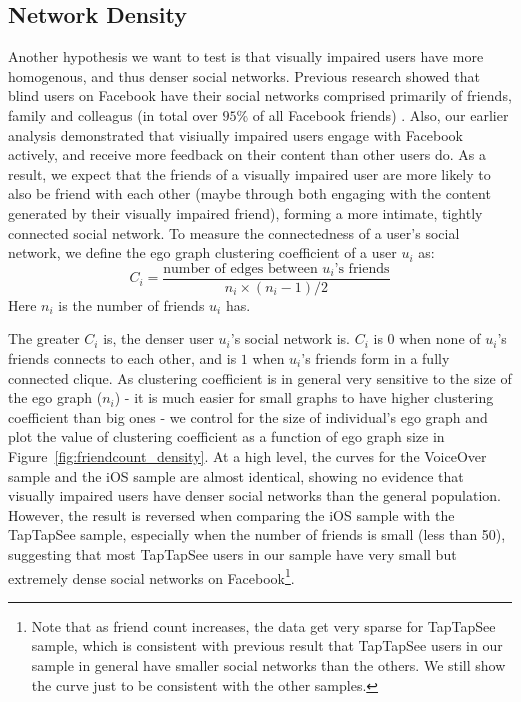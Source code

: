 \documentclass{sigchi}
\begin{document}
\subsection{Network Density}

Another hypothesis we want to test is that visually impaired users have more homogenous, and thus denser social networks. Previous research showed that blind users on Facebook have their social networks comprised primarily of friends, family and colleagus (in total over $95\%$ of all Facebook friends) \cite{brady2013cscw}. Also, our earlier analysis demonstrated that visiually impaired users engage with Facebook actively, and receive more feedback on their content than other users do. As a result, we expect that the friends of a visually impaired user are more likely to also be friend with each other (maybe through both engaging with the content generated by their visually impaired friend), forming a more intimate, tightly connected social network. To measure the connectedness of a user's social network, we define the ego graph clustering coefficient of a user $u_i$ as:
\begin{equation}
C_i=\frac{\text{number of edges between } u_i\text{'s friends}}{n_i\times(n_i-1)/2}
\end{equation}
Here $n_i$ is the number of friends $u_i$ has.

The greater $C_i$ is, the denser user $u_i$'s social network is. $C_i$ is $0$ when none of $u_i$'s friends connects to each other, and is $1$ when $u_i$'s friends form in a fully connected clique. As clustering coefficient is in general very sensitive to the size of the ego graph ($n_i$) - it is much easier for small graphs to have higher clustering coefficient than big ones - we control for the size of individual's ego graph and plot the value of clustering coefficient as a function of ego graph size in Figure~\ref{fig:friendcount_density}. At a high level, the curves for the VoiceOver sample and the iOS sample are almost identical, showing no evidence that visually impaired users have denser social networks than the general population.
However, the result is reversed when comparing the iOS sample with the TapTapSee sample, especially when the number of friends is small (less than 50), suggesting that most TapTapSee users in our sample have very small but extremely dense social networks on Facebook\footnote{Note that as friend count increases, the data get very sparse for TapTapSee sample, which is consistent with previous result that TapTapSee users in our sample in general have smaller social networks than the others. We still show the curve just to be consistent with the other samples.}. 
\end{document}
